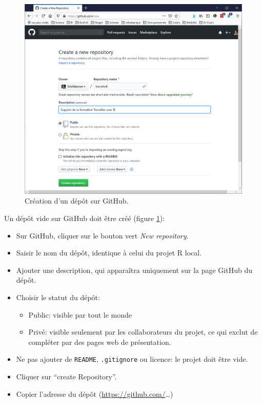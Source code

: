 \documentclass[
  11pt,
  french,
  a4paper,
  extrafontsizes,onecolumn,openright
  ]{memoir}
\providecommand{\tightlist}{%
  \setlength{\itemsep}{0pt}\setlength{\parskip}{0pt}}
\begin{document}
\scriptsize

\begin{figure}

{\centering \includegraphics[width=0.8\linewidth]{images/CreateRepo} 

}

\caption{Création d'un dépôt sur GitHub.}\label{fig:CreateRepo}
\end{figure}

\normalsize

Un dépôt vide sur GitHub doit être créé (figure \ref{fig:CreateRepo}):

\begin{itemize}
\tightlist
\item
  Sur GitHub, cliquer sur le bouton vert \emph{New repository}.
\item
  Saisir le nom du dépôt, identique à celui du projet R local.
\item
  Ajouter une description, qui apparaîtra uniquement sur la page GitHub du dépôt.
\item
  Choisir le statut du dépôt:

  \begin{itemize}
  \tightlist
  \item
    Public: visible par tout le monde
  \item
    Privé: visible seulement par les collaborateurs du projet, ce qui exclut de compléter par des pages web de présentation.
  \end{itemize}
\item
  Ne pas ajouter de \texttt{README}, \texttt{.gitignore} ou licence: le projet doit être vide.
\item
  Cliquer sur ``create Repository''.
\item
  Copier l'adresse du dépôt (\url{https://github.com/}\ldots)
\end{itemize}
\end{document}
